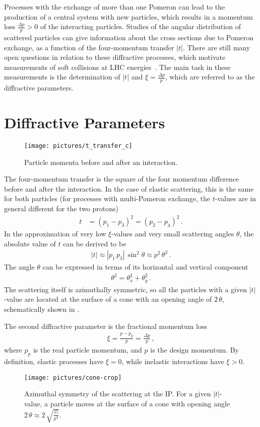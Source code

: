 Processes with the exchange of more than one Pomeron can lead to the production of a central system with new particles, which results in a momentum loss $\frac{\Delta p}{p} > 0$ of the interacting particles. Studies of the angular distribution of scattered particles can give information about the cross sections due to Pomeron exchange, as a function of the four-momentum transfer $|t|$. There are still many open questions in relation to these diffractive processes, which motivate measurements of soft collisions at LHC energies~\cite{Hermes:1505271,LHCAcceleratorExperiments}. The main task in these measurements is the determination of $|t|$ and $\xi=\frac{\Delta p}{p}$, which are referred to as the diffractive parameters. 
\section{Diffractive Parameters}
%
\begin{figure}[b]
  \centering
  \texttt{[image: pictures/t\_transfer\_c]}
  \caption{Particle momenta before and after an interaction.} \label{13012001} 
\end{figure}
%
The four-momentum transfer is the square of the four momentum difference before and after the interaction. In the case of elastic scattering, this is the same for both particles (for processes with multi-Pomeron exchange, the $t$-values are in general different for the two protons)~\cite{PDG}
%
\begin{align}
t&= (p_1 - p_3)^2 = (p_2-p_4)^2 \, .
\end{align}
%
In the approximation of very low $\xi$-values and very small scattering angles $\theta$, the absolute value of $t$ can be derived to be~\cite{PDG}
\begin{align}
|t| \approx  |p_1 \, p_3| \, \sin^2 \theta \approx p^2 \, \theta^2  \, .
\end{align}
%
The angle $\theta$ can be expressed in terms of its horizontal and vertical component
\begin{align}
\theta^2 = \theta_x^2 + \theta_y^2 \,. \label{eq:theta} 
\end{align}
The scattering itself is azimuthally symmetric, so all the particles with a given $|t|$-value are located at the surface of a cone with an opening angle of $2 \, \theta$, schematically shown in . 

The second diffractive parameter is the fractional momentum loss 
\begin{align}
\xi = \frac{p-p_p}{p} = \frac{\Delta p}{p}  \, ,
\end{align}
where $p_p$ is the real particle momentum, and $p$ is the design momentum. By definition, elastic processes have $\xi=0$, while inelastic interactions have $\xi > 0$.
%
%
\begin{figure}[t]
  \centering
  \texttt{[image: pictures/cone-crop]}
  \caption{Azimuthal symmetry of the scattering at the IP. For a given $|t|$-value, a particle moves at the surface of a cone with opening angle $2 \, \theta \approx 2 \, \sqrt{\frac{|t|}{p^2}}$.} \label{13021101} 
\end{figure}
%
